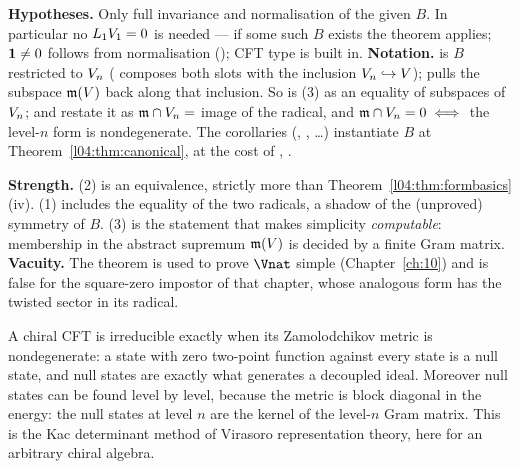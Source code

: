 \begin{dictionary}
\textbf{Hypotheses.} Only full invariance and normalisation of the given $B$. In particular no
$L_1V_1 = 0$ is needed --- if some such $B$ exists the theorem applies; $\mathbf{1}\ne0$ follows from
normalisation (\allowbreak{}\allowbreak{}\allowbreak{}\allowbreak{}); CFT type is built in. \textbf{Notation.}
 is $B$ restricted to $V_n$ ( composes both slots with the inclusion
$V_n\hookrightarrow V$);  pulls the subspace $\mathfrak{m}(V)$ back along that inclusion. So
 is (3) as an equality of subspaces of $V_n$; \allowbreak{}\allowbreak{}
and \allowbreak{}\allowbreak{}\allowbreak{}\allowbreak{}\allowbreak{} restate it as $\mathfrak{m}\cap V_n = $ image of the radical, and
$\mathfrak{m}\cap V_n = 0\iff$ the level-$n$ form is nondegenerate. The  corollaries
(\allowbreak{}\allowbreak{}\allowbreak{}, \allowbreak{}\allowbreak{}\allowbreak{}, …) instantiate
$B$ at Theorem~\ref{l04:thm:canonical}, at the cost of , .

\textbf{Strength.} (2) is an equivalence, strictly more than Theorem~\ref{l04:thm:formbasics}(iv). (1)
includes the equality of the two radicals, a shadow of the (unproved) symmetry of $B$. (3) is the
statement that makes simplicity \emph{computable}: membership in the abstract supremum $\mathfrak{m}(V)$ is
decided by a finite Gram matrix. \textbf{Vacuity.} The theorem is used to prove $\Vnat$ simple
(Chapter~\ref{ch:10}) and is false for the square-zero impostor of that chapter, whose analogous form has
the twisted sector in its radical.
\end{dictionary}
\begin{physics}
A chiral CFT is irreducible exactly when its Zamolodchikov metric is nondegenerate: a state with zero
two-point function against every state is a null state, and null states are exactly what generates a
decoupled ideal. Moreover null states can be found level by level, because the metric is block diagonal
in the energy: the null states at level $n$ are the kernel of the level-$n$ Gram matrix. This is the Kac
determinant method of Virasoro representation theory, here for an arbitrary chiral algebra.
\end{physics}
